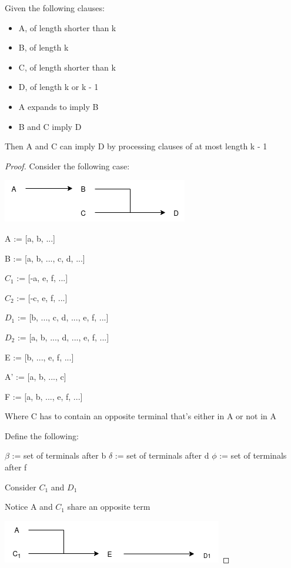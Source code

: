\documentclass[manuscript]{acmart}
\begin{document}
    \begin{lemma}
        Given the following clauses:
        \begin{itemize}
            \item A, of length shorter than k
            \item B, of length k
            \item C, of length shorter than k
            \item D, of length k or k - 1
            \item A expands to imply B
            \item B and C imply D
        \end{itemize}
        Then A and C can imply D by processing clauses of at most length k - 1
    \end{lemma}
    \begin{proof}

        Consider the following case:

        \includegraphics{318}

        A := [a, b, ...]

        B := [a, b, ..., c, d, ...]

        $C_1$ := [-a, e, f, ...]

        $C_2$ := [-c, e, f, ...]

        $D_1$ := [b, ..., c, d, ..., e, f, ...]

        $D_2$ := [a, b, ..., d, ..., e, f, ...]

        E := [b, ..., e, f, ...]

        A' := [a, b, ..., c]

        F := [a, b, ..., e, f, ...]

        Where C has to contain an opposite terminal that's either in A or not in A

        Define the following:

        $\beta$ := set of terminals after b
        $\delta$ := set of terminals after d
        $\phi$ := set of terminals after f

        Consider $C_1$ and $D_1$

        Notice A and $C_1$ share an opposite term

        \includegraphics[scale=0.8]{318b.png}
        

\end{proof}
\end{document}
